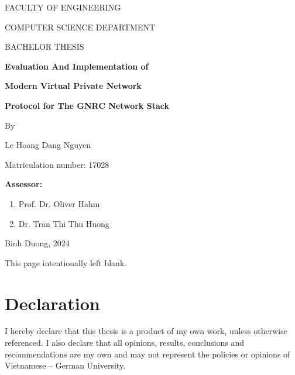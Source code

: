 \documentclass[12pt,twoside]{report}
\begin{document}
\begin{titlepage}
\begin{center}
    \uppercase{\large Faculty of engineering}

    \vspace*{0.5cm}

    \uppercase{\large Computer Science Department}

    \vspace{1.5cm}
    \uppercase{Bachelor Thesis}
    \vspace{1.5cm}


    \textbf{\LARGE 
    Evaluation And Implementation of}
    \vspace{0.3cm}

    \textbf {\LARGE Modern Virtual Private Network }

    \vspace{0.3cm}
    \textbf{\LARGE Protocol for The GNRC Network Stack}

    \vspace{1.2cm}
    \large By
    \vspace{0.2cm}

    \large Le Hoang Dang Nguyen
    \vspace{0.2cm}

    \large Matriculation number: 17028
    \vspace{0.2cm}

    \begin{flushleft}
    \hspace{0.3cm}
    \textbf{Assessor:}
    \begin{enumerate}
      \item Prof. Dr. Oliver Hahm
      \item Dr. Tran Thi Thu Huong
    \end{enumerate}
    \end{flushleft}

    \vfill

    Binh Duong, 2024

  \end{center}
\end{titlepage}

\newpage  %
\thispagestyle{empty}  %
\hbox{}  %
\vfill  %
\begin{center}
\Large This page intentionally left blank.
\end{center}
\vfill  %

\newpage  %

\chapter *{\centering Declaration}
\doublespacing
\large I hereby declare that this thesis is a product of my own work, unless
otherwise referenced. I also declare that all opinions, results, conclusions
and recommendations are my own and may not represent the policies or
opinions of Vietnamese – German University.
\end{document}
